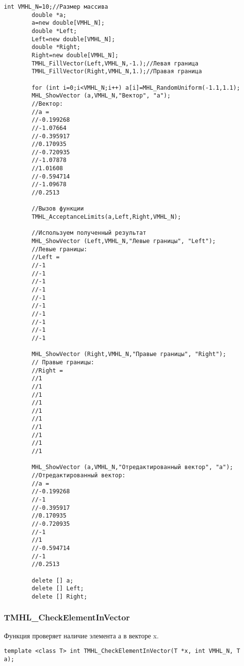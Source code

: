 \documentclass[a4paper,12pt]{article}
\begin{document}
\begin{lstlisting}[label=code_use_TMHL_AcceptanceLimits,caption=Пример использования]
        int VMHL_N=10;//Размер массива
        double *a;
        a=new double[VMHL_N];
        double *Left;
        Left=new double[VMHL_N];
        double *Right;
        Right=new double[VMHL_N];
        TMHL_FillVector(Left,VMHL_N,-1.);//Левая граница
        TMHL_FillVector(Right,VMHL_N,1.);//Правая граница

        for (int i=0;i<VMHL_N;i++) a[i]=MHL_RandomUniform(-1.1,1.1);
        MHL_ShowVector (a,VMHL_N,"Вектор", "a");
        //Вектор:
        //a =
        //-0.199268
        //-1.07664
        //-0.395917
        //0.170935
        //-0.720935
        //-1.07878
        //1.01608
        //-0.594714
        //-1.09678
        //0.2513

        //Вызов функции
        TMHL_AcceptanceLimits(a,Left,Right,VMHL_N);

        //Используем полученный результат
        MHL_ShowVector (Left,VMHL_N,"Левые границы", "Left");
        //Левые границы:
        //Left =
        //-1
        //-1
        //-1
        //-1
        //-1
        //-1
        //-1
        //-1
        //-1
        //-1

        MHL_ShowVector (Right,VMHL_N,"Правые границы", "Right");
        // Правые границы:
        //Right =
        //1
        //1
        //1
        //1
        //1
        //1
        //1
        //1
        //1
        //1

        MHL_ShowVector (a,VMHL_N,"Отредактированный вектор", "a");
        //Отредактированный вектор:
        //a =
        //-0.199268
        //-1
        //-0.395917
        //0.170935
        //-0.720935
        //-1
        //1
        //-0.594714
        //-1
        //0.2513

        delete [] a;
        delete [] Left;
        delete [] Right;
\end{lstlisting}

\subsubsection{TMHL\_CheckElementInVector}\label{TMHL_CheckElementInVector}

Функция проверяет наличие элемента а в векторе x.


\begin{lstlisting}[label=code_syntax_TMHL_CheckElementInVector,caption=Синтаксис]
template <class T> int TMHL_CheckElementInVector(T *x, int VMHL_N, T a);
\end{lstlisting}
\end{document}
